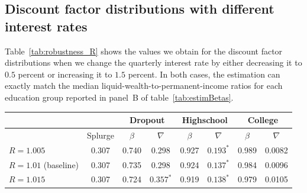 \documentclass{econsocart}
\begin{document}
\subsection*{Discount factor distributions with different interest rates}
\whenintegrated{\label{sec:robust_R_estim}} %

Table~\ref{tab:robustness_R} shows the values we obtain for the discount factor distributions when we change the quarterly interest rate by either decreasing it to $0.5$ percent or increasing it to $1.5$ percent. In both cases, the estimation can exactly match the median liquid-wealth-to-permanent-income ratios for each education group reported in panel~B of table~\ref{tab:estimBetas}.

\begin{center}
  \begin{tabular}{lc|cccccc}
    \toprule
                          &         & \multicolumn{2}{c}{Dropout} & \multicolumn{2}{c}{Highschool} & \multicolumn{2}{c}{College}                                    \\ \midrule
                          & Splurge & $\beta$                     & $\nabla$                       & $\beta$                     & $\nabla$    & $\beta$ & $\nabla$ \\ \midrule
    $R = 1.005$           & 0.307   & 0.740                       & 0.298                          & 0.927                       & $0.193^{*}$ & 0.989   & 0.0082   \\
    $R = 1.01$ (baseline) & 0.307   & 0.735                       & 0.298                          & 0.924                       & $0.137^{*}$ & 0.984   & 0.0096   \\
    $R = 1.015$           & 0.307   & 0.724                       & $0.357^{*}$                    & 0.919                       & $0.138^{*}$ & 0.979   & 0.0105
    \\ \bottomrule
  \end{tabular}
  \label{tab:robustness_R}
\end{center}
\end{document}
